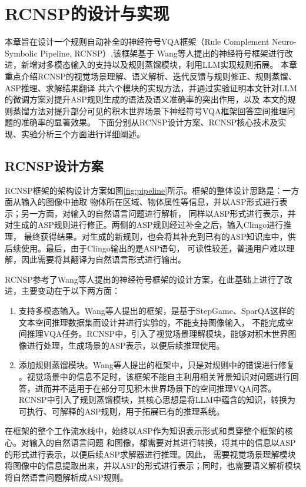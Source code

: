 \chapter{RCNSP的设计与实现}
本章旨在设计一个规则自动补全的神经符号VQA框架（Rule Complement Neuro-Symbolic Pipeline, RCNSP）,该框架基于
Wang等人提出的神经符号框架进行改进，新增对多模态输入的支持以及规则蒸馏模块，利用LLM实现规则拓展。
本章重点介绍RCNSP的视觉场景理解、语义解析、迭代反馈与规则修正、规则蒸馏、ASP推理、求解结果翻译
共六个模块的实现方法，并通过实验证明本文针对LLM的微调方案对提升ASP规则生成的语法及语义准确率的突出作用，以及
本文的规则蒸馏方法对提升部分可见的积木世界场景下神经符号VQA框架回答空间推理问题的准确率的显著效果。
下面分别从RCNSP设计方案、RCNSP核心技术及实现、实验分析三个方面进行详细阐述。
\section{RCNSP设计方案}
RCNSP框架的架构设计方案如图\ref{fig:pipeline}所示。框架的整体设计思路是：一方面从输入的图像中抽取
物体所在区域、物体属性等信息，并以ASP形式进行表示；另一方面，对输入的自然语言问题进行解析，
同样以ASP形式进行表示，并对生成的ASP规则进行修正。两侧的ASP规则经过补全之后，输入Clingo进行推理，
最终获得结果。对生成的新规则，也会将其补充到已有的ASP知识库中，供后续使用。最后，由于Clingo输出的是ASP语句，
可读性较差，普通用户难以理解，因此需要将其翻译为自然语言形式进行输出。

RCNSP参考了Wang等人提出的神经符号框架\cite{wang2024dspy}的设计方案，在此基础上进行了改进，主要变动在于以下两方面：
\begin{enumerate}[nosep]
\item 支持多模态输入。Wang等人提出的框架，是基于StepGame、SparQA这样的文本空间推理数据集而设计并进行实验的，不能支持图像输入，
不能完成空间推理VQA任务。RCNSP中，引入了视觉场景理解模块，能够对积木世界图像进行处理，生成场景的ASP表示，以便后续推理使用。
\item 添加规则蒸馏模块。Wang等人提出的框架中，只是对规则中的错误进行修复
。视觉场景中的信息不足时，该框架不能自主利用相关背景知识对问题进行回答，进而并不适用于在部分可见积木世界场景下的空间推理VQA问答。
RCNSP中引入了规则蒸馏模块，其核心思想是将LLM中蕴含的知识，转换为可执行、可解释的ASP规则，用于拓展已有的推理系统。
\end{enumerate}

在框架的整个工作流水线中，始终以ASP作为知识表示形式和贯穿整个框架的核心。对输入的自然语言问题
和图像，都需要对其进行转换，将其中的信息以ASP的形式进行表示，以便后续ASP求解器进行推理。因此，
需要视觉场景理解模块将图像中的信息提取出来，并以ASP的形式进行表示；同时，也需要语义解析模块
将自然语言问题解析成ASP规则。

